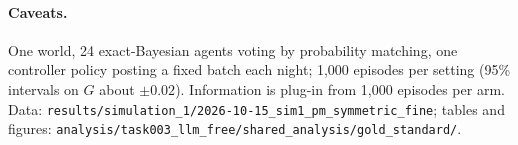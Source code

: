 \documentclass[10pt,a4paper]{article}
\begin{document}
\paragraph{Caveats.} One world, 24 exact-Bayesian agents voting by probability matching, one controller policy
posting a fixed batch each night; 1{,}000 episodes per setting (95\% intervals on $G$ about $\pm0.02$). Information
is plug-in from 1{,}000 episodes per arm. Data:
\texttt{results/simulation\_1/2026-10-15\_sim1\_pm\_symmetric\_fine}; tables and figures:
\texttt{analysis/task003\_llm\_free/shared\_analysis/gold\_standard/}.
\end{document}
